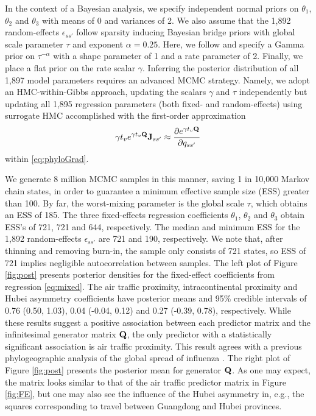 \documentclass[12pt]{article} %
\begin{document}
In the context of a Bayesian analysis, we specify independent normal priors on $\theta_1$, $\theta_2$ and $\theta_3$ with means of 0 and variances of 2.  We also assume that the 1,892 random-effects $\epsilon_{ss'}$ follow sparsity inducing Bayesian bridge priors with global scale parameter $\tau$ and exponent $\alpha=0.25$.  Here, we follow \citet{nishimura2022shrinkage} and specify a Gamma prior on $\tau^{-\alpha}$ with a shape parameter of 1 and a rate parameter of 2. Finally, we place a flat prior on the rate scalar $\gamma$.  Inferring the posterior distribution of all 1,897 model parameters requires an advanced MCMC strategy. Namely, we adopt an HMC-within-Gibbs approach, updating the scalars $\gamma$ and $\tau$ independently but updating all 1,895 regression parameters (both fixed- and random-effects) using surrogate HMC accomplished with the first-order approximation
\begin{align*}
  \gamma t_v  e^{\gamma t_v \mathbf{Q}} \mathbf{J}_{ss'}    \approx \frac{\partial e^{\gamma t_v \mathbf{Q}}}{\partial q_{ss'}} 
\end{align*}
within \eqref{eq:phyloGrad}.

We generate 8 million MCMC samples in this manner, saving 1 in 10,000 Markov chain states, in order to guarantee a minimum effective sample size (ESS) greater than 100.  By far, the worst-mixing parameter  is the global scale $\tau$, which obtains an ESS of 185.  The three fixed-effects regression coefficients $\theta_1$, $\theta_2$ and $\theta_3$ obtain ESS's of 721, 721 and 644, respectively.  The median and minimum ESS for the 1,892 random-effects $\epsilon_{ss'}$ are 721 and 190, respectively.  We note that, after thinning and removing burn-in, the sample only consists of 721 states, so ESS of 721 implies negligible autocorrelation between samples.  The left plot of Figure \ref{fig:post} presents posterior densities for the fixed-effect coefficients from regression \eqref{eq:mixed}.  The air traffic proximity, intracontinental proximity and Hubei asymmetry coefficients have posterior means and 95\% credible intervals of 0.76 (0.50, 1.03), 0.04 (-0.04, 0.12) and 0.27 (-0.39, 0.78), respectively. While these results suggest a positive association between each predictor matrix and the infinitesimal generator matrix $\mathbf{Q}$, the only predictor with a statistically significant association is air traffic proximity.  This result agrees with a previous phylogeographic analysis of the global spread of influenza \citep{holbrook2021massive}.  The right plot of Figure \ref{fig:post} presents the posterior mean for generator $\mathbf{Q}$.  As one may expect, the matrix looks similar to that of the air traffic predictor matrix in Figure \ref{fig:FE}, but one may also see the influence of the Hubei asymmetry in, e.g., the squares corresponding to travel between Guangdong and Hubei provinces.
\end{document}
